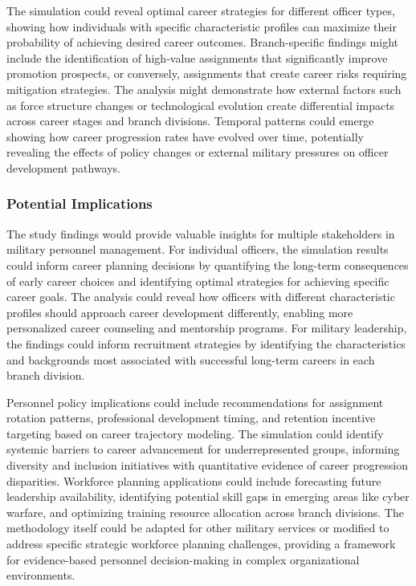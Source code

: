 \documentclass[main.tex]{subfiles}
\begin{document}
The simulation could reveal optimal career strategies for different officer types, showing how individuals with specific characteristic profiles can maximize their probability of achieving desired career outcomes. Branch-specific findings might include the identification of high-value assignments that significantly improve promotion prospects, or conversely, assignments that create career risks requiring mitigation strategies. The analysis might demonstrate how external factors such as force structure changes or technological evolution create differential impacts across career stages and branch divisions. Temporal patterns could emerge showing how career progression rates have evolved over time, potentially revealing the effects of policy changes or external military pressures on officer development pathways.

\subsubsection{Potential Implications}

The study findings would provide valuable insights for multiple stakeholders in military personnel management. For individual officers, the simulation results could inform career planning decisions by quantifying the long-term consequences of early career choices and identifying optimal strategies for achieving specific career goals. The analysis could reveal how officers with different characteristic profiles should approach career development differently, enabling more personalized career counseling and mentorship programs. For military leadership, the findings could inform recruitment strategies by identifying the characteristics and backgrounds most associated with successful long-term careers in each branch division.

Personnel policy implications could include recommendations for assignment rotation patterns, professional development timing, and retention incentive targeting based on career trajectory modeling. The simulation could identify systemic barriers to career advancement for underrepresented groups, informing diversity and inclusion initiatives with quantitative evidence of career progression disparities. Workforce planning applications could include forecasting future leadership availability, identifying potential skill gaps in emerging areas like cyber warfare, and optimizing training resource allocation across branch divisions. The methodology itself could be adapted for other military services or modified to address specific strategic workforce planning challenges, providing a framework for evidence-based personnel decision-making in complex organizational environments.

\end{document}
